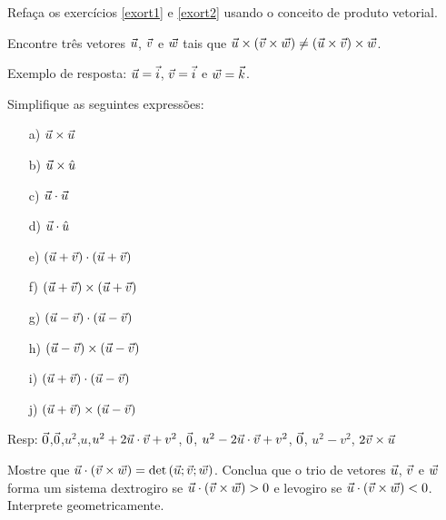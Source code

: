 \begin{exer} Refaça os exercícios \ref{exort1} e \ref{exort2} usando o conceito de produto vetorial.
\end{exer}

\begin{exer}\label{prodvecnaoassoc} Encontre três vetores $\vec{u}$, $\vec{v}$ e $\vec{w}$ tais que $\vec{u}\times\left(\vec{v}\times\vec{w}\right)\neq \left(\vec{u}\times\vec{v}\right)\times \vec{w}$. 
\end{exer}
Exemplo de resposta: $\vec{u}=\vec{i}$, $\vec{v}=\vec{i}$ e $\vec{w}=\vec{k}$.

\begin{exer} Simplifique as seguintes expressões:
\begin{itemize}
\item[a)] $\vec{u}\times\vec{u}$
\item[b)] $\vec{u}\times\hat{u}$
\item[c)] $\vec{u}\cdot\vec{u}$
\item[d)] $\vec{u}\cdot\hat{u}$
\item[e)] $\left(\vec{u}+\vec{v}\right)\cdot\left(\vec{u}+\vec{v}\right)$
\item[f)] $\left(\vec{u}+\vec{v}\right)\times\left(\vec{u}+\vec{v}\right)$
\item[g)] $\left(\vec{u}-\vec{v}\right)\cdot\left(\vec{u}-\vec{v}\right)$
\item[h)] $\left(\vec{u}-\vec{v}\right)\times\left(\vec{u}-\vec{v}\right)$
\item[i)] $\left(\vec{u}+\vec{v}\right)\cdot\left(\vec{u}-\vec{v}\right)$
\item[j)] $\left(\vec{u}+\vec{v}\right)\times\left(\vec{u}-\vec{v}\right)$
\end{itemize}
\end{exer}
Resp: $\vec{0}$,$\vec{0}$,$u^2$,$u$,$u^2+2\vec{u}\cdot\vec{v}+v^2$, $\vec{0}$, $u^2-2\vec{u}\cdot\vec{v}+v^2$, $\vec{0}$, $u^2-v^2$, $2\vec{v}\times\vec{u}$ 


\begin{exer} Mostre que $\vec{u}\cdot \left(\vec{v}\times\vec{w}\right)=\det\left(\vec{u};\vec{v};\vec{w}\right)$. Conclua que o trio de vetores $\vec{u}$, $\vec{v}$ e $\vec{w}$ forma um sistema dextrogiro se $\vec{u}\cdot \left(\vec{v}\times\vec{w}\right)>0$ e levogiro se $\vec{u}\cdot \left(\vec{v}\times\vec{w}\right)<0$. Interprete geometricamente.
\end{exer}


